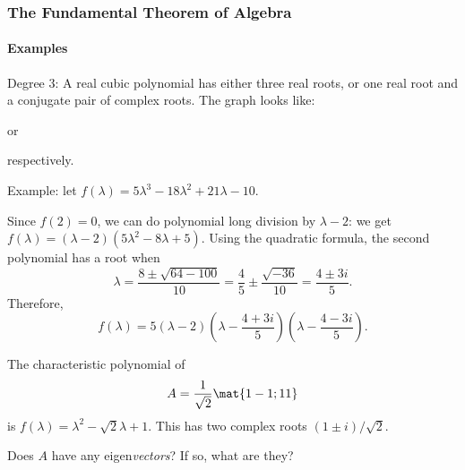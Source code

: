 
\begin{frame}
\frametitle{The Fundamental Theorem of Algebra}
\framesubtitle{Examples}

\alert{Degree $3$:}
A real cubic polynomial has either
\pause
three real roots, or
\pause
one real root and a conjugate pair of complex roots.
\pause
The graph looks like:
\begin{center}
\quad or \quad
{}
\end{center}
respectively.

\pause\medskip
\alert{Example:} let
$f(\lambda) = 5\lambda^3 - 18\lambda^2 + 21\lambda - 10$.\\[1mm]
\begin{webonly}
Since $f(2) = 0$, we can do polynomial long division by $\lambda-2$: we get
$f(\lambda) = (\lambda-2)\left( 5\lambda^2-8\lambda+5 \right)$.
Using the quadratic formula, the second polynomial has a root when
\[ \lambda = \frac{8 \pm \sqrt{64-100}}{10}
= \frac 45 \pm \frac{\sqrt{-36}}{10}
= \frac{4 \pm 3i}5. \]
Therefore,
\[ f(\lambda) = 5(\lambda-2)\left( \lambda-\frac{4+3i}5 \right)
\left( \lambda-\frac{4-3i}5 \right). \]
\end{webonly}

\end{frame}



\begin{pollframe}

\bigskip
The characteristic polynomial of 
\[ A = \frac 1{\sqrt 2}\mat{1 -1; 1 1} \]
is $f(\lambda) = \lambda^2-\sqrt 2\lambda+1$.  This has two complex roots
$(1\pm i)/\sqrt 2$.

\begin{poll}
\pause\bigskip
\begin{bluebox}[Poll]{.8\linewidth}
  Does $A$ have any eigen\emph{vectors}?  If so, what are they?
\end{bluebox}
\end{poll}

\end{pollframe}


